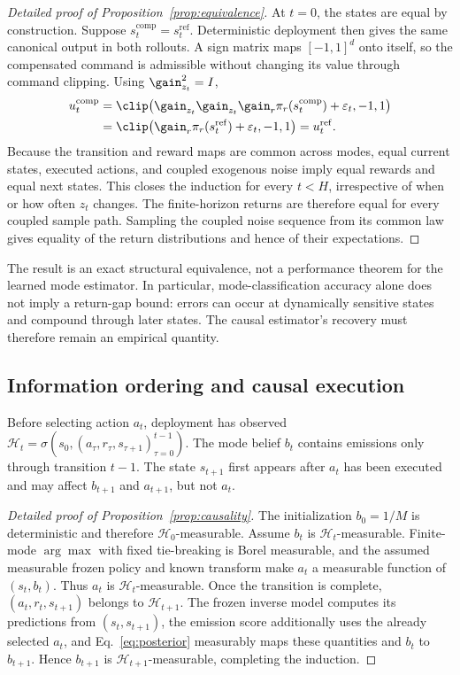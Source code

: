 \begin{proof}[Detailed proof of Proposition~\ref{prop:equivalence}]
At $t=0$, the states are equal by construction. Suppose
$s_t^{\mathrm{comp}}=s_t^{\mathrm{ref}}$. Deterministic deployment then gives the same canonical output in both rollouts. A sign matrix maps $[-1,1]^d$ onto itself, so the compensated command is admissible without changing its value through command clipping. Using $\gain_{z_t}^2=I$,
\begin{align}
u_t^{\mathrm{comp}}
&=\clip\!\left(
\gain_{z_t}\gain_{z_t}\gain_r
\pi_r(s_t^{\mathrm{comp}})+\varepsilon_t,-1,1\right)\\
&=\clip\!\left(
\gain_r\pi_r(s_t^{\mathrm{ref}})+\varepsilon_t,-1,1\right)
=u_t^{\mathrm{ref}}.
\end{align}
Because the transition and reward maps are common across modes, equal current states, executed actions, and coupled exogenous noise imply equal rewards and equal next states. This closes the induction for every $t<H$, irrespective of when or how often $z_t$ changes. The finite-horizon returns are therefore equal for every coupled sample path. Sampling the coupled noise sequence from its common law gives equality of the return distributions and hence of their expectations.
\end{proof}

The result is an exact structural equivalence, not a performance theorem for the learned mode estimator. In particular, mode-classification accuracy alone does not imply a return-gap bound: errors can occur at dynamically sensitive states and compound through later states. The causal estimator's recovery must therefore remain an empirical quantity.

\subsection{Information ordering and causal execution}

Before selecting action $a_t$, deployment has observed
$\mathcal{H}_t=\sigma\!\left(s_0,(a_\tau,r_\tau,s_{\tau+1})_{\tau=0}^{t-1}\right)$.
The mode belief $b_t$ contains emissions only through transition $t-1$. The state $s_{t+1}$ first appears after $a_t$ has been executed and may affect $b_{t+1}$ and $a_{t+1}$, but not $a_t$.

\begin{proof}[Detailed proof of Proposition~\ref{prop:causality}]
The initialization $b_0=1/M$ is deterministic and therefore $\mathcal{H}_0$-measurable. Assume $b_t$ is $\mathcal{H}_t$-measurable. Finite-mode $\arg\max$ with fixed tie-breaking is Borel measurable, and the assumed measurable frozen policy and known transform make $a_t$ a measurable function of $(s_t,b_t)$. Thus $a_t$ is $\mathcal{H}_t$-measurable. Once the transition is complete, $(a_t,r_t,s_{t+1})$ belongs to $\mathcal{H}_{t+1}$. The frozen inverse model computes its predictions from $(s_t,s_{t+1})$, the emission score additionally uses the already selected $a_t$, and Eq.~\eqref{eq:posterior} measurably maps these quantities and $b_t$ to $b_{t+1}$. Hence $b_{t+1}$ is $\mathcal{H}_{t+1}$-measurable, completing the induction.
\end{proof}

